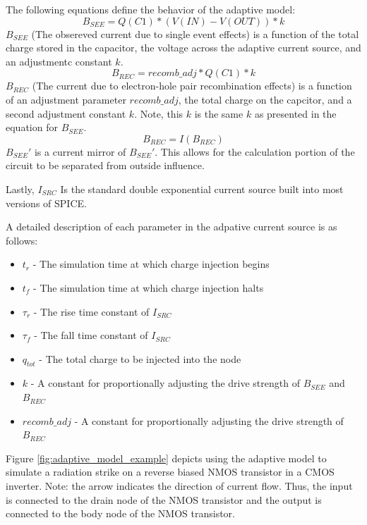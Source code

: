 \documentclass[conference]{IEEEtran}
\begin{document}
The following equations define the behavior of the adaptive model:
{\large
\[B_{SEE}=Q(C1)*(V(IN)-V(OUT))*k\]
}
\(B_{SEE}\) (The obsereved current due to single event effects) is a function of the total charge stored in the capacitor, the voltage across the adaptive current source, and an adjustmentc constant \(k\).
{\large
\[B_{REC}=recomb\_adj*Q(C1)*k\]
}
\(B_{REC}\) (The current due to electron-hole pair recombination effects) is a function of an adjustment parameter \(recomb\_adj\), the total charge on the capcitor, and a second adjustment constant \(k\). Note, this \(k\) is the same \(k\) as presented in the equation for \(B_{SEE}\).
{\large
\[B_{REC}=I(B_{REC})\]
}
\(B_{SEE}'\) is a current mirror of \(B_{SEE}'\). This allows for the calculation portion of the circuit to be separated from outside influence.

Lastly, \(I_{SRC}\) Is the standard double exponential current source built into most versions of SPICE.

A detailed description of each parameter in the adpative current source is as follows:

\begin{itemize}

\item[] \(t_r\) - The simulation time at which charge injection begins

\item[] \(t_f\) - The simulation time at which charge injection halts

\item[] \(\tau_r\) - The rise time constant of \(I_{SRC}\)

\item[] \(\tau_f\) - The fall time constant of \(I_{SRC}\)

\item[] \(q_{tot}\) - The total charge to be injected into the node

\item[] \(k\) - A constant for proportionally adjusting the drive strength of \(B_{SEE}\) and \(B_{REC}\)

\item[] \(recomb\_adj\) - A constant for proportionally adjusting the drive strength of \(B_{REC}\)

\end{itemize}
\vspace{1em}

Figure \ref{fig:adaptive_model_example} depicts using the adaptive model to simulate a radiation strike on a reverse biased NMOS transistor in a CMOS inverter. Note: the arrow indicates the direction of current flow. Thus, the input is connected to the drain node of the NMOS transistor and the output is connected to the body node of the NMOS transistor.
\end{document}
